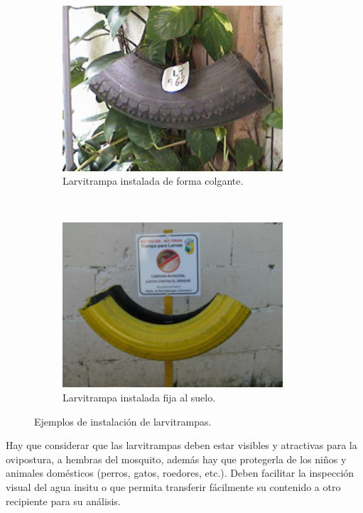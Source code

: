 \begin{figure}[!htbp]
    \centering
    \begin{subfigure}[t]{0.45\textwidth}
        \includegraphics[width=0.9\textwidth]{anexos/graphics/ej1-larvitrampa.png}
        \caption{\label{fig:anexo-disenho-1}Larvitrampa instalada de forma colgante.}
    \end{subfigure}
    ~~~~
    \begin{subfigure}[t]{0.45\textwidth}
        \includegraphics[width=0.9\textwidth]{anexos/graphics/ej2-larvitrampa.png}
        \caption{\label{fig:anexo-disenho-2} Larvitrampa instalada fija al suelo.}
    \end{subfigure}
    \caption{\label{fig:instalacion-larvitrampas} Ejemplos de instalación de larvitrampas.}
\end{figure}

Hay que considerar que las larvitrampas deben estar visibles y atractivas para la ovipostura, a
hembras del mosquito, además hay que protegerla de los niños y animales domésticos (perros, gatos,
roedores, etc.). Deben facilitar la inspección visual del agua insitu o que permita transferir
fácilmente su contenido a otro recipiente para su análisis.

